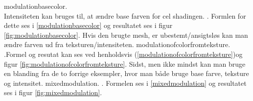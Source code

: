  {modulationbasecolor}. 
\\Intensiteten kan bruges til, at ændre base farven for cel shadingen. . Formlen for dette ses i \ref{modulationbasecolor} og resultatet ses i figur \ref{fig:modulationbasecolor}. 
Hvis den brugte mesh, er ubestemt/ansigtsløs kan man ændre farven ud fra teksturen/intensiteten.  {modulationofcolorfromteksture}. .Formel og resutat kan ses ved henholdsvis (\ref{modulationofcolorfromteksture})og figur \ref{fig:modulationofcolorfromteksture}. Sidst, men ikke mindst kan man bruge en blanding fra de to forrige eksempler, hvor man både bruge base farve, teksture og intensitet. {mixedmodulation}. . Formelen ses i \ref{mixedmodulation} og resultatet ses i figur \ref{fig:mixedmodulation}. 




